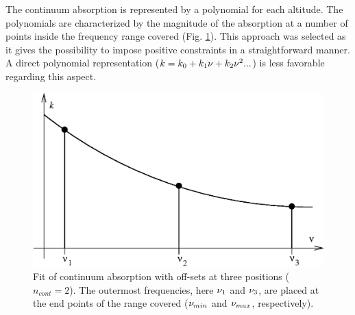  The continuum absorption is represented by a polynomial for each
 altitude. The polynomials are characterized by the magnitude of the
 absorption at a number of points inside the frequency range covered
 (Fig. \ref{fig:wfuns:cont}). This approach was selected as it gives
 the possibility to impose positive constraints in a straightforward
 manner. A direct polynomial representation ($k=k_0+k_1\nu+k_2\nu^2...$) 
 is less favorable regarding this aspect.
 
 \begin{figure}[t]
  \begin{center}
   \includegraphics*[width=0.95\hsize]{Figs/contfit.eps}
   \caption{Fit of continuum absorption with off-sets at three 
            positions ($n_{cont}=2$). The outermost frequencies, here 
            $\nu_1$ and $\nu_3$, are placed at the end points of the 
            range covered ($\nu_{min}$ and $\nu_{max}$, respectively).}
   \label{fig:wfuns:cont}  
  \end{center}
 \end{figure}

